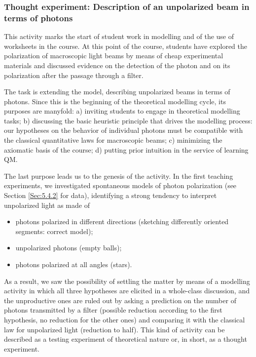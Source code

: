\documentclass[twocolumn,secnumarabic,amssymb, nobibnotes, aps, prd, nofootinbib]{revtex4-2}
\begin{document}

\subsubsection{Thought experiment: Description of an unpolarized beam in terms of photons} \label{Sec:3.4.3}

This activity marks the start of student work in modelling and of the use of worksheets in the course. At this point of the course, students have explored the polarization of macroscopic light beams by means of cheap experimental materials and discussed evidence on the detection of the photon and on its polarization after the passage through a filter.

The task is extending the model, describing unpolarized beams in terms of photons. Since this is the beginning of the theoretical modelling cycle, its purposes are manyfold: a) inviting students to engage in theoretical modelling tasks; b) discussing the basic heuristic principle that drives the modelling process: our hypotheses on the behavior of individual photons must be compatible with the classical quantitative laws for macroscopic beams; c) minimizing the axiomatic basis of the course; d) putting prior intuition in the service of learning QM.

The last purpose leads us to the genesis of the activity. In the first teaching experiments, we investigated spontaneous models of photon polarization (see Section \ref{Sec:5.4.2} for data), identifying a strong tendency to interpret unpolarized light as made of
\begin{itemize}
    \item photons polarized in different directions (sketching differently oriented segments: correct model);
    \item unpolarized photons (empty balls);
    \item photons polarized at all angles (stars).
\end{itemize}

As a result, we saw the possibility of settling the matter by means of a modelling activity in which all three hypotheses are elicited in a whole-class discussion, and the unproductive ones are ruled out by asking a prediction on the number of photons transmitted by a filter (possible reduction according to the first hypothesis, no reduction for the other ones) and comparing it with the classical law for unpolarized light (reduction to half). This kind of activity can be described as a testing experiment of theoretical nature or, in short, as a thought experiment.
\end{document}
